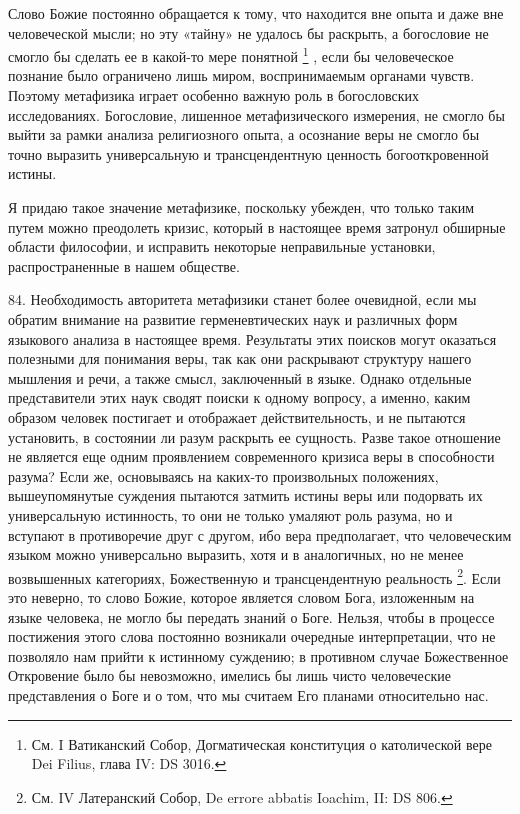 \documentclass[a5paper,10pt]{article}
\begin{document}
Слово Божие постоянно обращается к тому, что находится вне опыта и даже вне
человеческой мысли; но эту «тайну» не удалось бы раскрыть, а богословие не
смогло бы сделать ее в какой-то мере понятной \footnote{См. I Ватиканский
Собор, Догматическая конституция о католической вере Dei Filius, глава IV: DS
3016.} , если бы человеческое познание было ограничено лишь миром,
воспринимаемым органами чувств. Поэтому метафизика играет особенно важную роль
в богословских исследованиях.  Богословие, лишенное метафизического измерения,
не смогло бы выйти за рамки анализа религиозного опыта, а осознание веры не
смогло бы точно выразить универсальную и трансцендентную ценность
богооткровенной истины.

Я придаю такое значение метафизике, поскольку убежден, что только таким путем
можно преодолеть кризис, который в настоящее время затронул обширные области
философии, и исправить некоторые неправильные установки, распространенные в
нашем обществе.

84. Необходимость авторитета метафизики станет более очевидной, если мы обратим
внимание на развитие герменевтических наук и различных форм языкового анализа в
настоящее время. Результаты этих поисков могут оказаться полезными для
понимания веры, так как они раскрывают структуру нашего мышления и речи, а
также смысл, заключенный в языке. Однако отдельные представители этих наук
сводят поиски к одному вопросу, а именно, каким образом человек постигает и
отображает действительность, и не пытаются установить, в состоянии ли разум
раскрыть ее сущность. Разве такое отношение не является еще одним проявлением
современного кризиса веры в способности разума? Если же, основываясь на
каких-то произвольных положениях, вышеупомянутые суждения пытаются затмить
истины веры или подорвать их универсальную истинность, то они не только умаляют
роль разума, но и вступают в противоречие друг с другом, ибо вера предполагает,
что человеческим языком можно универсально выразить, хотя и в аналогичных, но
не менее возвышенных категориях, Божественную и трансцендентную реальность
\footnote{См. IV Латеранский Собор, De errore abbatis Ioachim, II: DS 806.}.
Если это неверно, то слово Божие, которое является словом Бога, изложенным на
языке человека, не могло бы передать знаний о Боге. Нельзя, чтобы в процессе
постижения этого слова постоянно возникали очередные интерпретации, что не
позволяло нам прийти к истинному суждению; в противном случае Божественное
Откровение было бы невозможно, имелись бы лишь чисто человеческие представления
о Боге и о том, что мы считаем Его планами относительно нас.
\end{document}
